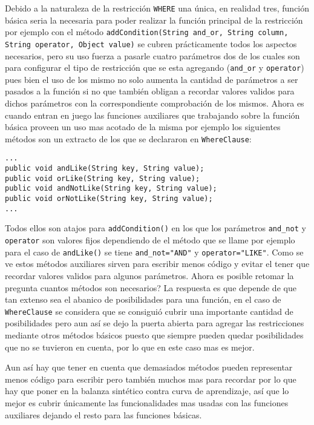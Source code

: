 Debido a la naturaleza de la restricción \verb=WHERE= una única, en realidad tres, función básica seria la necesaria para poder realizar la función principal de la restricción por ejemplo con el método \verb=addCondition(String and_or, String column, String operator, Object value)= se cubren prácticamente todos los aspectos necesarios, pero su uso fuerza a pasarle cuatro parámetros dos de los cuales son para configurar el tipo de restricción que se esta agregando (\verb=and_or= y \verb=operator=) pues bien el uso de los mismo no solo aumenta la cantidad de parámetros a ser pasados a la función si no que también obligan a recordar valores validos para dichos parámetros con la correspondiente comprobación de los mismos. Ahora es cuando entran en juego las funciones auxiliares que trabajando sobre la función básica proveen un uso mas acotado de la misma por ejemplo los siguientes métodos son un extracto de los que se declararon en \verb=WhereClause=:
%
\begin{lstlisting}[title=Extracto de WhereClause]
...
public void andLike(String key, String value);
public void orLike(String key, String value);
public void andNotLike(String key, String value);
public void orNotLike(String key, String value);
...
\end{lstlisting}
%
Todos ellos son atajos para \verb=addCondition()= en los que los parámetros \verb=and_not= y \verb=operator= son valores fijos dependiendo de el método que se llame por ejemplo para el caso de \verb=andLike()= se tiene \verb|and_not="AND"|  y \verb|operator="LIKE"|. Como se ve estos métodos auxiliares sirven para escribir menos código y evitar el tener que recordar valores validos para algunos parámetros. Ahora es posible retomar la pregunta cuantos métodos son necesarios? La respuesta es que depende de que tan extenso sea el abanico de posibilidades para una función, en el caso de \verb=WhereClause= se considera que se consiguió cubrir una importante cantidad de posibilidades pero aun así se dejo la puerta abierta para agregar las restricciones mediante otros métodos básicos puesto que siempre pueden quedar posibilidades que no se tuvieron en cuenta, por lo que en este caso mas es mejor.

Aun así hay que tener en cuenta que demasiados métodos pueden representar menos código para escribir pero también muchos mas para recordar por lo que hay que poner en la balanza sintético contra curva de aprendizaje, así que lo mejor es cubrir únicamente las  funcionalidades mas usadas con las funciones auxiliares dejando el resto para las funciones básicas.
%

